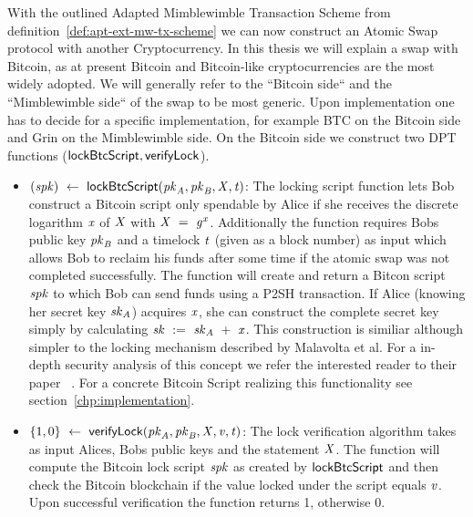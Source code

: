 With the outlined Adapted Mimblewimble Transaction Scheme from definition~\ref{def:apt-ext-mw-tx-scheme} we can now construct an Atomic Swap protocol with another Cryptocurrency.
In this thesis we will explain a swap with Bitcoin, as at present Bitcoin and Bitcoin-like cryptocurrencies are the most widely adopted.
We will generally refer to the ``Bitcoin side`` and the ``Mimblewimble side`` of the swap to be most generic.
Upon implementation one has to decide for a specific implementation, for example BTC on the Bitcoin side and Grin on
the Mimblewimble side.
On the Bitcoin side we construct two DPT functions ($\mathsf{lockBtcScript}, \mathsf{verifyLock}$).
\begin{itemize}
    \item $(\mathit{spk}) ~\leftarrow~ \mathsf{lockBtcScript} (\mathit{pk}_{\mathit{A}},\mathit{pk}_{\mathit{B}},\mathit{X},\mathit{t})$:
    The locking script function lets Bob construct a Bitcoin script only spendable by Alice if she receives the discrete logarithm
    $\mathit{x}$ of $\mathit{X}$ with $\mathit{X} ~=~ \mathit{g}^{\mathit{x}}$.
    Additionally the function requires Bobs public key $\mathit{pk}_{\mathit{B}}$ and a timelock $\mathit{t}$ (given as a block
    number) as input which allows Bob to reclaim his funds after some time if the atomic swap was not
    completed successfully. The function will create and return a Bitcon script $\mathit{spk}$ to which Bob can send funds using a P2SH transaction.
    If Alice (knowing her secret key $\mathit{sk}_{\mathit{A}}$) acquires $\mathit{x}$, she can construct the complete secret key simply
    by calculating $\mathit{sk} ~:=~ \mathit{sk}_{\mathit{A}} ~+~ \mathit{x}$.
    This construction is similiar although simpler to the locking mechanism described by Malavolta et al. For a in-depth security analysis of this concept we refer the interested reader to their paper ~\cite{malavolta2019anonymous}.
    For a concrete Bitcoin Script realizing this functionality see section~\ref{chp:implementation}.
    \item $\{ 1,0 \} ~\leftarrow~ \mathsf{verifyLock} (\mathit{pk}_{\mathit{A}},\mathit{pk}_{\mathit{B}},\mathit{X},\mathit{v},\mathit{t})$:
    The lock verification algorithm takes as input Alices,
    Bobs public keys and the statement $\mathit{X}$. The function will compute the Bitcoin lock script
    $\mathit{spk}$ as created by $\mathsf{lockBtcScript}$ and then check the Bitcoin blockchain if the value locked
    under the script equals $\mathit{v}$.
    Upon successful verification the function returns 1, otherwise 0.
\end{itemize}

